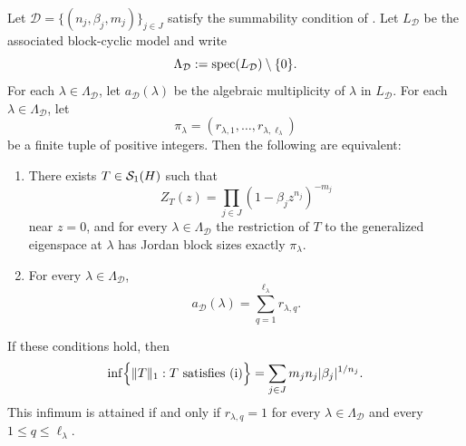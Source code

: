 \begin{theorem}
  \label{thm:nonnormal-jordan-classification}
  Let
  \(
    \mathcal D=\{(n_j,\beta_j,m_j)\}_{j\in J}
  \)
  satisfy the summability condition of
  . Let \(L_{\mathcal D}\) be the
  associated block-cyclic model and write
  \[
    \Lambda_{\mathcal D}:=\operatorname{spec}(L_{\mathcal D})\setminus\{0\}.
  \]
  For each \(\lambda\in \Lambda_{\mathcal D}\), let
  \(a_{\mathcal D}(\lambda)\) be the algebraic multiplicity of
  \(\lambda\) in \(L_{\mathcal D}\). For each \(\lambda\in
  \Lambda_{\mathcal D}\), let
  \[
    \pi_\lambda=(r_{\lambda,1},\dots,r_{\lambda,\ell_\lambda})
  \]
  be a finite tuple of positive integers. Then the following are
  equivalent:
  \begin{enumerate}[label=\textup{(\roman*)}]
    \item There exists \(T\in \mathcal S_1(H)\) such that
      \[
        Z_T(z)=\prod_{j\in J}(1-\beta_j z^{n_j})^{-m_j}
      \]
      near \(z=0\), and for every \(\lambda\in \Lambda_{\mathcal D}\)
      the restriction of \(T\) to the generalized eigenspace at
      \(\lambda\) has Jordan block sizes exactly
      \(\pi_\lambda\).
    \item For every \(\lambda\in \Lambda_{\mathcal D}\),
      \[
        a_{\mathcal D}(\lambda)
        =\sum_{q=1}^{\ell_\lambda}r_{\lambda,q}.
      \]
  \end{enumerate}
  If these conditions hold, then
  \[
    \inf\Bigl\{\|T\|_1:T\text{ satisfies \textup{(i)}}\Bigr\}
    =\sum_{j\in J}m_jn_j\lvert \beta_j \rvert^{1/n_j}.
  \]
  This infimum is attained if and only if
  \(r_{\lambda,q}=1\) for every \(\lambda\in \Lambda_{\mathcal D}\) and
  every \(1\le q\le \ell_\lambda\).
\end{theorem}

